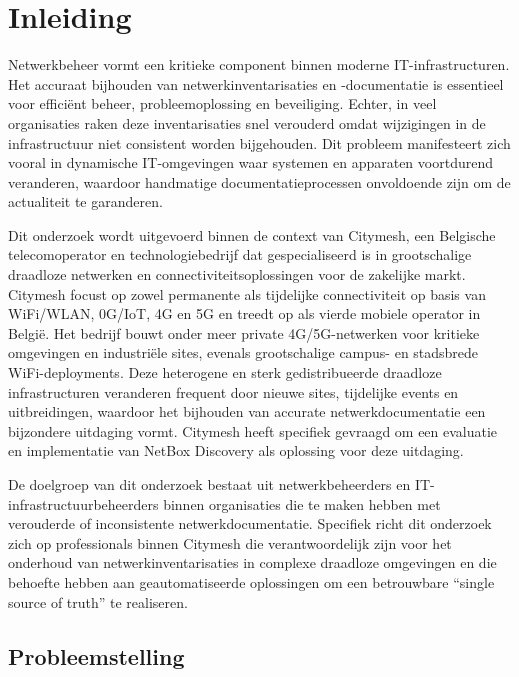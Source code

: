 
\section{Inleiding}%
\label{sec:inleiding}

Netwerkbeheer vormt een kritieke component binnen moderne IT-infrastructuren. Het accuraat bijhouden van netwerkinventarisaties en -documentatie is essentieel voor efficiënt beheer, probleemoplossing en beveiliging. Echter, in veel organisaties raken deze inventarisaties snel verouderd omdat wijzigingen in de infrastructuur niet consistent worden bijgehouden. Dit probleem manifesteert zich vooral in dynamische IT-omgevingen waar systemen en apparaten voortdurend veranderen, waardoor handmatige documentatieprocessen onvoldoende zijn om de actualiteit te garanderen.\autocite{Campbell2007}

Dit onderzoek wordt uitgevoerd binnen de context van Citymesh, een Belgische telecomoperator en technologiebedrijf dat gespecialiseerd is in grootschalige draadloze netwerken en connectiviteitsoplossingen voor de zakelijke markt.\autocite{CitymeshAbout,CitymeshLinkedIn} Citymesh focust op zowel permanente als tijdelijke connectiviteit op basis van WiFi/WLAN, 0G/IoT, 4G en 5G en treedt op als vierde mobiele operator in België.\autocite{CitymeshAbout,Mice2022} Het bedrijf bouwt onder meer private 4G/5G-netwerken voor kritieke omgevingen en industriële sites, evenals grootschalige campus- en stadsbrede WiFi-deployments.\autocite{CitymeshPrivate5G,CitymeshWiFi} Deze heterogene en sterk gedistribueerde draadloze infrastructuren veranderen frequent door nieuwe sites, tijdelijke events en uitbreidingen, waardoor het bijhouden van accurate netwerkdocumentatie een bijzondere uitdaging vormt. Citymesh heeft specifiek gevraagd om een evaluatie en implementatie van NetBox Discovery als oplossing voor deze uitdaging.

De doelgroep van dit onderzoek bestaat uit netwerkbeheerders en IT-infrastructuurbeheerders binnen organisaties die te maken hebben met verouderde of inconsistente netwerkdocumentatie. Specifiek richt dit onderzoek zich op professionals binnen Citymesh die verantwoordelijk zijn voor het onderhoud van netwerkinventarisaties in complexe draadloze omgevingen en die behoefte hebben aan geautomatiseerde oplossingen om een betrouwbare ``single source of truth'' te realiseren.

\subsection{Probleemstelling}

